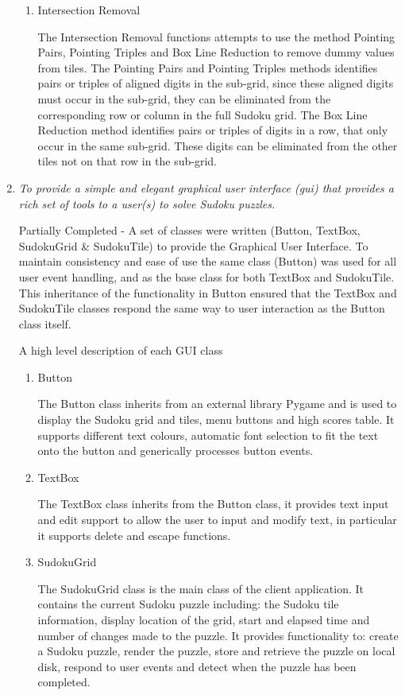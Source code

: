 \documentclass[fleqn]{article}
\begin{document}
\begin{enumerate}
\begin{enumerate}
\item{Intersection Removal}

The Intersection Removal functions attempts to use the method Pointing Pairs, Pointing
Triples and Box Line Reduction to remove dummy values from tiles. The Pointing Pairs and Pointing Triples methods identifies pairs or triples of aligned digits in the sub-grid, since these aligned digits must occur in the sub-grid, they can be eliminated from the corresponding row or column in the full Sudoku grid. 
The Box Line Reduction method identifies pairs or triples of digits in a row, that only occur in the same sub-grid. These digits can be eliminated from the other tiles not on that row in the sub-grid.

\end{enumerate}

\item{\textit{To provide a simple and elegant graphical user interface (gui) that provides a rich set of tools to a user(s) to solve Sudoku puzzles.}}

Partially Completed - A set of classes were written (Button, TextBox, SudokuGrid \& SudokuTile) to provide the Graphical User Interface. To maintain consistency and ease of use the same class (Button) was used for all user event handling, and as the base class for both TextBox and SudokuTile. This inheritance of the functionality in Button ensured that the TextBox and SudokuTile classes respond the same way to user interaction as the Button class itself. 

A high level description of each GUI class 
\begin{enumerate}

\item{Button}

The Button class inherits from an external library Pygame and is used to display the Sudoku grid and tiles, menu buttons and high scores table. It supports different text colours, automatic font selection to fit the text onto the button and generically processes button events.

\item{TextBox}

The TextBox class inherits from the Button class, it provides text input and edit support to allow the user to input and modify text, in particular it supports delete and escape functions.

\item{SudokuGrid}

The SudokuGrid class is the main class of the client application. It contains the current Sudoku puzzle including: the Sudoku tile information, display location of the grid, start and elapsed time and number of changes made to the puzzle. It provides functionality to: create a Sudoku puzzle, render the puzzle, store and retrieve the puzzle on local disk, respond to user events and detect when the puzzle has been completed.


\end{enumerate}
\end{enumerate}
\end{document}
